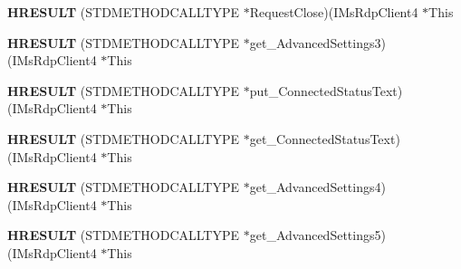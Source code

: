 \begin{DoxyCompactItemize}
{\bfseries H\+R\+E\+S\+U\+LT} (S\+T\+D\+M\+E\+T\+H\+O\+D\+C\+A\+L\+L\+T\+Y\+PE $\ast$Request\+Close)(I\+Ms\+Rdp\+Client4 $\ast$This
\item 
\mbox{\label{struct_i_ms_rdp_client4_vtbl_a2c3a4a469e7d7d9406a33a6a9272617a}} 
{\bfseries H\+R\+E\+S\+U\+LT} (S\+T\+D\+M\+E\+T\+H\+O\+D\+C\+A\+L\+L\+T\+Y\+PE $\ast$get\+\_\+\+Advanced\+Settings3)(I\+Ms\+Rdp\+Client4 $\ast$This
\item 
\mbox{\label{struct_i_ms_rdp_client4_vtbl_a42d0b8efbf69cc7affa1fbd61798bf09}} 
{\bfseries H\+R\+E\+S\+U\+LT} (S\+T\+D\+M\+E\+T\+H\+O\+D\+C\+A\+L\+L\+T\+Y\+PE $\ast$put\+\_\+\+Connected\+Status\+Text)(I\+Ms\+Rdp\+Client4 $\ast$This
\item 
\mbox{\label{struct_i_ms_rdp_client4_vtbl_a0f83aae81448474438a65937e8fed0ba}} 
{\bfseries H\+R\+E\+S\+U\+LT} (S\+T\+D\+M\+E\+T\+H\+O\+D\+C\+A\+L\+L\+T\+Y\+PE $\ast$get\+\_\+\+Connected\+Status\+Text)(I\+Ms\+Rdp\+Client4 $\ast$This
\item 
\mbox{\label{struct_i_ms_rdp_client4_vtbl_a7f58136e435cd44f43abc4dafd7ae2a7}} 
{\bfseries H\+R\+E\+S\+U\+LT} (S\+T\+D\+M\+E\+T\+H\+O\+D\+C\+A\+L\+L\+T\+Y\+PE $\ast$get\+\_\+\+Advanced\+Settings4)(I\+Ms\+Rdp\+Client4 $\ast$This
\item 
\mbox{\label{struct_i_ms_rdp_client4_vtbl_a49dcc613580a067fbacc9467d99387b9}} 
{\bfseries H\+R\+E\+S\+U\+LT} (S\+T\+D\+M\+E\+T\+H\+O\+D\+C\+A\+L\+L\+T\+Y\+PE $\ast$get\+\_\+\+Advanced\+Settings5)(I\+Ms\+Rdp\+Client4 $\ast$This
\end{DoxyCompactItemize}
